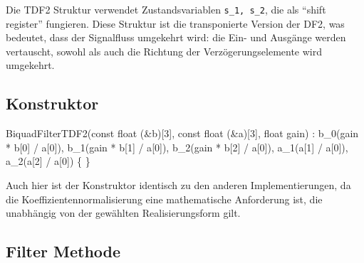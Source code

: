 \documentclass[
  ngerman,
  letterpaper,
  DIV=11]{scrreprt}
\newenvironment{Shaded}{\begin{snugshade}}{\end{snugshade}}
\newcommand{\AttributeTok}[1]{\textcolor[rgb]{0.40,0.45,0.13}{#1}}
\newcommand{\DataTypeTok}[1]{\textcolor[rgb]{0.68,0.00,0.00}{#1}}
\newcommand{\DecValTok}[1]{\textcolor[rgb]{0.68,0.00,0.00}{#1}}
\newcommand{\NormalTok}[1]{\textcolor[rgb]{0.00,0.23,0.31}{#1}}
\newcommand{\OperatorTok}[1]{\textcolor[rgb]{0.37,0.37,0.37}{#1}}
\begin{document}
Die TDF2 Struktur verwendet Zustandsvariablen \texttt{s\_1,\ s\_2}, die
als ``shift register'' fungieren. Diese Struktur ist die transponierte
Version der DF2, was bedeutet, dass der Signalfluss umgekehrt wird: die
Ein- und Ausgänge werden vertauscht, sowohl als auch die Richtung der
Verzögerungselemente wird umgekehrt.

\subsection{Konstruktor}\label{konstruktor-2}

\begin{Shaded}
\begin{Highlighting}[]
\NormalTok{BiquadFilterTDF2}\OperatorTok{(}\AttributeTok{const} \DataTypeTok{float} \OperatorTok{(\&}\NormalTok{b}\OperatorTok{)[}\DecValTok{3}\OperatorTok{],} \AttributeTok{const} \DataTypeTok{float} \OperatorTok{(\&}\NormalTok{a}\OperatorTok{)[}\DecValTok{3}\OperatorTok{],} \DataTypeTok{float}\NormalTok{ gain}\OperatorTok{)}  
    \OperatorTok{:}\NormalTok{ b\_0}\OperatorTok{(}\NormalTok{gain }\OperatorTok{*}\NormalTok{ b}\OperatorTok{[}\DecValTok{0}\OperatorTok{]} \OperatorTok{/}\NormalTok{ a}\OperatorTok{[}\DecValTok{0}\OperatorTok{]),}
\NormalTok{      b\_1}\OperatorTok{(}\NormalTok{gain }\OperatorTok{*}\NormalTok{ b}\OperatorTok{[}\DecValTok{1}\OperatorTok{]} \OperatorTok{/}\NormalTok{ a}\OperatorTok{[}\DecValTok{0}\OperatorTok{]),}
\NormalTok{      b\_2}\OperatorTok{(}\NormalTok{gain }\OperatorTok{*}\NormalTok{ b}\OperatorTok{[}\DecValTok{2}\OperatorTok{]} \OperatorTok{/}\NormalTok{ a}\OperatorTok{[}\DecValTok{0}\OperatorTok{]),}
\NormalTok{      a\_1}\OperatorTok{(}\NormalTok{a}\OperatorTok{[}\DecValTok{1}\OperatorTok{]} \OperatorTok{/}\NormalTok{ a}\OperatorTok{[}\DecValTok{0}\OperatorTok{]),}
\NormalTok{      a\_2}\OperatorTok{(}\NormalTok{a}\OperatorTok{[}\DecValTok{2}\OperatorTok{]} \OperatorTok{/}\NormalTok{ a}\OperatorTok{[}\DecValTok{0}\OperatorTok{])} 
\OperatorTok{\{}
\OperatorTok{\}}
\end{Highlighting}
\end{Shaded}

Auch hier ist der Konstruktor identisch zu den anderen
Implementierungen, da die Koeffizientennormalisierung eine mathematische
Anforderung ist, die unabhängig von der gewählten Realisierungsform
gilt.

\subsection{Filter Methode}\label{filter-methode-2}
\end{document}
